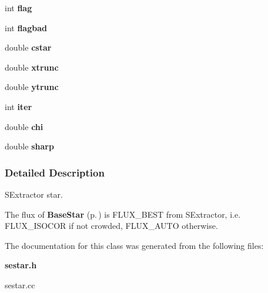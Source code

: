 \begin{CompactItemize}
\item 
{}
int {\bf flag}\label{class_sestar_n23}

\item 
{}
int {\bf flagbad}\label{class_sestar_n24}

\item 
{}
double {\bf cstar}\label{class_sestar_n25}

\item 
{}
double {\bf xtrunc}\label{class_sestar_n26}

\item 
{}
double {\bf ytrunc}\label{class_sestar_n27}

\item 
{}
int {\bf iter}\label{class_sestar_n28}

\item 
{}
double {\bf chi}\label{class_sestar_n29}

\item 
{}
double {\bf sharp}\label{class_sestar_n30}

\end{CompactItemize}


\subsubsection{Detailed Description}
SExtractor star.

The flux of {\bf Base\-Star} {\rm (p.\,\pageref{class_basestar})} is FLUX\_\-BEST from SExtractor, i.e. FLUX\_\-ISOCOR if not crowded, FLUX\_\-AUTO otherwise. 



The documentation for this class was generated from the following files:\begin{CompactItemize}
\item 
{\bf sestar.h}\item 
sestar.cc\end{CompactItemize}
